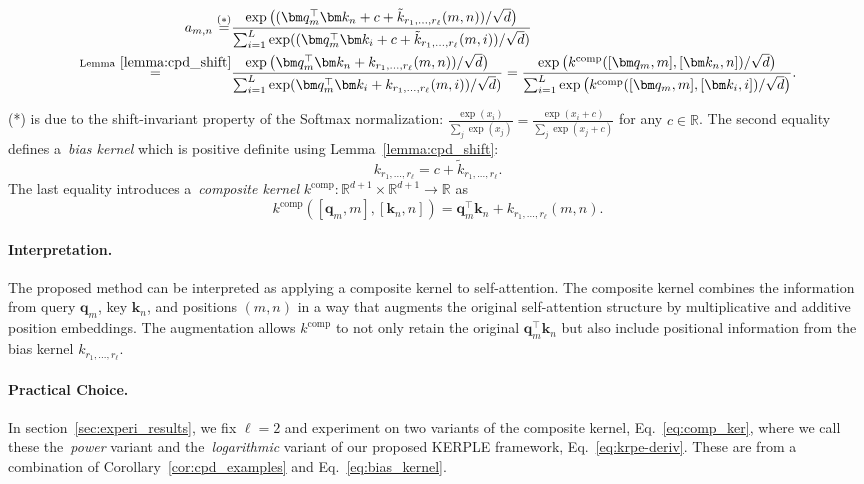 \begin{equation}
\begin{split}
    a_{m,n}\overset{(*)}{=}&\frac{\exp\big((\bm q_m^\top \bm k_n  +c+\tilde{k}_{r_1,...,r_\ell}(m,n))/\sqrt{d}\big)}{\sum_{i=1}^L \exp((\bm q_m^\top \bm k_i+c+\tilde{k}_{r_1,...,r_\ell}(m,i))/\sqrt{d})}\\
    \overset{\text{Lemma}~\ref{lemma:cpd_shift}}{=}&\frac{\exp\big(\bm q_m^\top \bm k_n+k_{r_1,...,r_\ell}(m,n))/\sqrt{d}\big)}{\sum_{i=1}^L \exp(\bm q_m^\top \bm k_i +k_{r_1,...,r_\ell}(m,i))/\sqrt{d})}=\frac{\exp\big(k^{\text{comp}}([\bm q_m,m],[\bm k_n,n])/\sqrt{d}\big)}{\sum_{i=1}^L \exp\big(k^{\text{comp}}([\bm q_m,m],[\bm k_i,i])/\sqrt{d}\big)}.
\end{split}
\label{eq:krpe-deriv}
\end{equation}

(*) is due to the shift-invariant property of the Softmax normalization: $\frac{\exp(x_i)}{\sum_j \exp(x_j)}=\frac{\exp(x_i+c)}{\sum_j \exp(x_j+c)}$ for any $c\in \mathbb{R}$. The second equality defines a~\emph{bias kernel} which is positive definite using Lemma~\ref{lemma:cpd_shift}:
\begin{equation}
    k_{r_1,...,r_\ell}= c+\tilde{k}_{r_1,...,r_\ell}.
    \label{eq:bias_kernel}
\end{equation}
The last equality introduces a~\emph{composite kernel} $k^{\text{comp}}:\mathbb{R}^{d+1}\times \mathbb{R}^{d+1}\rightarrow \mathbb{R}$ as
\begin{equation}
    k^{\text{comp}}([\bm q_m,m],[\bm k_n,n])= \bm q_m^\top \bm k_n + k_{r_1,...,r_\ell}(m,n).
    \label{eq:comp_ker}
\end{equation}

\paragraph{Interpretation.} The proposed method can be interpreted as applying a composite kernel to self-attention. The composite kernel combines the information from query $\bm q_m$, key $\bm k_n$, and positions $(m,n)$ in a way that augments the original self-attention structure by multiplicative and additive position embeddings. The augmentation allows $k^{\text{comp}}$ to not only retain the original $\bm q_m^\top \bm k_n$ but also include positional information from the bias kernel $k_{r_1,...,r_\ell}$.

\paragraph{Practical Choice.} In section~\ref{sec:experi_results}, we fix $\ell=2$ and experiment on two variants of the composite kernel, Eq.~\eqref{eq:comp_ker}, where we call these the~\emph{power} variant and  the~\emph{logarithmic} variant of our proposed KERPLE framework, Eq.~\eqref{eq:krpe-deriv}. These are from a combination of Corollary~\ref{cor:cpd_examples} and Eq.~\eqref{eq:bias_kernel}.

